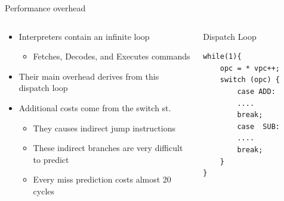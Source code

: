 \documentclass[10pt]{beamer}
\begin{document}
\begin{frame}[fragile]{Performance overhead}
    \begin{columns}[T] %
        \begin{column}{.65\textwidth}
            \begin{center}
                \begin{itemize}
                    \item {Interpreters contain an infinite loop}
                        \begin{itemize}
                            \item {Fetches, Decodes, and Executes commands}
                        \end{itemize}
                    \item {Their main overhead derives from this dispatch loop}
                    \item {Additional costs come from the switch st.}
                        \begin{itemize}
                            \item {They causes indirect jump instructions}
                            \item {These indirect branches are very difficult to predict}
                            \item {Every miss prediction costs almost 20 cycles}
                        \end{itemize}
                \end{itemize}
            \end{center}
        \end{column}%
            \hfill%
            \begin{column}{.35\textwidth}
                \begin{alertblock}{Dispatch Loop}
                    \begin{center}
                        \begin{lstlisting}[basicstyle=\footnotesize , breaklines]
while(1){
    opc = * vpc++;
    switch (opc) {
        case ADD:
        ....
        break;
        case  SUB:
        ....				
        break;
    }	
}
                        \end{lstlisting}
                    \end{center}
                \end{alertblock}
            \end{column}%
    \end{columns}
\end{frame}
\end{document}
